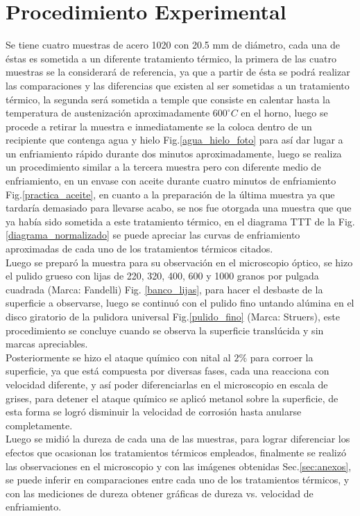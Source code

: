 \documentclass[a4paper, 9pt]{article}
\begin{document}
\section{Procedimiento Experimental}
Se tiene cuatro muestras de acero 1020 con 20.5 mm de diámetro, cada una de éstas es sometida a un diferente tratamiento térmico, la primera de las cuatro muestras se la considerará de referencia, ya que a partir de ésta se podrá realizar las comparaciones y las diferencias que existen al ser sometidas a un tratamiento térmico, la segunda será sometida a temple que consiste en calentar hasta la temperatura de austenización aproximadamente $600^{\circ}C$ en el horno, luego se procede a retirar la muestra e inmediatamente se la coloca dentro de un recipiente que contenga agua y hielo Fig.\ref{agua_hielo_foto} para así dar lugar a un enfriamiento rápido durante dos minutos aproximadamente, luego se realiza un procedimiento similar a la tercera muestra pero con diferente medio de enfriamiento, en un envase con aceite durante cuatro minutos de enfriamiento Fig.\ref{practica_aceite}, en cuanto a la preparación de la última muestra ya que tardaría demasiado para llevarse acabo, se nos fue otorgada una muestra que que ya había sido sometida a este tratamiento térmico, en el diagrama TTT de la Fig. \ref{diagrama_normalizado} se puede apreciar las curvas de enfriamiento aproximadas de cada uno de los tratamientos térmicos citados.
\\
Luego se preparó la muestra para su observación en el microscopio óptico, se hizo el pulido grueso con lijas de 220, 320, 400, 600 y 1000 granos por pulgada cuadrada (Marca: Fandelli) Fig. \ref{banco_lijas}, para hacer el desbaste de la superficie a observarse, luego se continuó con el pulido fino untando alúmina en el disco giratorio de la pulidora universal Fig.\ref{pulido_fino} (Marca: Struers), este procedimiento se concluye cuando se observa la superficie translúcida y sin marcas apreciables.
\\
Posteriormente se hizo el ataque químico con nital al $2\%$ para corroer la superficie, ya que está compuesta por diversas fases, cada una reacciona con velocidad diferente, y así poder diferenciarlas en el microscopio en escala de grises, para detener el ataque químico se aplicó metanol sobre la superficie, de esta forma se logró disminuir la velocidad de corrosión hasta anularse completamente.
\\
Luego se midió la dureza de cada una de las muestras, para lograr diferenciar los efectos que ocasionan los tratamientos térmicos empleados, finalmente se realizó las observaciones en el microscopio y con las imágenes obtenidas Sec.\ref{sec:anexos}, se puede inferir en comparaciones entre cada uno de los tratamientos térmicos, y con las mediciones de dureza obtener gráficas de dureza vs. velocidad de enfriamiento.
\\
\end{document}
